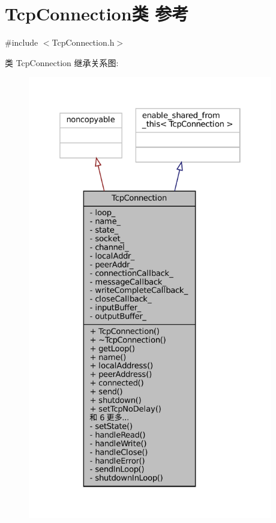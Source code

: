 \hypertarget{classmuduo_1_1TcpConnection}{}\section{Tcp\+Connection类 参考}
\label{classmuduo_1_1TcpConnection}


{\ttfamily \#include $<$Tcp\+Connection.\+h$>$}



类 Tcp\+Connection 继承关系图\+:
\nopagebreak
\begin{figure}[H]
\begin{center}
\leavevmode
\includegraphics[height=550pt]{classmuduo_1_1TcpConnection__inherit__graph}
\end{center}
\end{figure}


